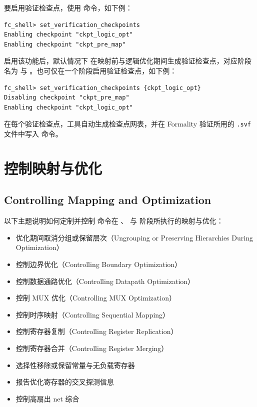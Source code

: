 要启用验证检查点，使用  命令，如下例：
\begin{lstlisting}
fc_shell> set_verification_checkpoints
Enabling checkpoint "ckpt_logic_opt"
Enabling checkpoint "ckpt_pre_map"
\end{lstlisting}

启用该功能后，默认情况下  在映射前与逻辑优化期间生成验证检查点，对应阶段名为  与 。也可仅在一个阶段启用验证检查点，如下例：
\begin{lstlisting}
fc_shell> set_verification_checkpoints {ckpt_logic_opt}
Disabling checkpoint "ckpt_pre_map"
Enabling checkpoint "ckpt_logic_opt"
\end{lstlisting}

在每个验证检查点，工具自动生成检查点网表，并在 Formality 验证所用的 \texttt{.svf} 文件中写入  命令。

\section{控制映射与优化}
\subsection*{Controlling Mapping and Optimization}

以下主题说明如何定制并控制  命令在 、 与  阶段所执行的映射与优化：
\begin{itemize}
  \item 优化期间取消分组或保留层次（Ungrouping or Preserving Hierarchies During Optimization）
  \item 控制边界优化（Controlling Boundary Optimization）
  \item 控制数据通路优化（Controlling Datapath Optimization）
  \item 控制 MUX 优化（Controlling MUX Optimization）
  \item 控制时序映射（Controlling Sequential Mapping）
  \item 控制寄存器复制（Controlling Register Replication）
  \item 控制寄存器合并（Controlling Register Merging）
  \item 选择性移除或保留常量与无负载寄存器
  \item 报告优化寄存器的交叉探测信息
  \item 控制高扇出 net 综合
\end{itemize}


